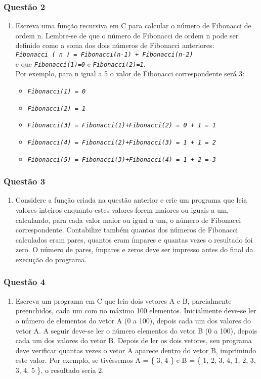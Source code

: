 \documentclass[aspectratio=169]{beamer}
\newcommand\setItemnumber[1]{\setcounter{enumi}{\numexpr#1-1\relax}}
\begin{document}
\begin{frame}\frametitle{Questão 2}
\begin{enumerate}
\setItemnumber{2}
\item Escreva uma função recursiva em C para calcular o número de Fibonacci de ordem n. Lembre-se de que o número de Fibonacci de ordem n pode ser definido como a soma dos dois números de Fibonacci anteriores:\\
\emph{\texttt{Fibonacci ( n )  = Fibonacci(n-1) + Fibonacci(n-2)}}\\
e que \emph{\texttt{Fibonacci(1)=0}} e \emph{\texttt{Fibonacci(2)=1}}.\\
Por exemplo, para n igual a 5 o valor de Fibonacci correspondente será 3:
\begin{itemize}
\item \emph{\texttt{Fibonacci(1) = 0}}
\item \emph{\texttt{Fibonacci(2) = 1}}
\item \emph{\texttt{Fibonacci(3) = Fibonacci(1)+Fibonacci(2) = 0 + 1 = 1}}
\item \emph{\texttt{Fibonacci(4) = Fibonacci(2)+Fibonacci(3) = 1 + 1 = 2}}
\item \emph{\texttt{Fibonacci(5) = Fibonacci(3)+Fibonacci(4) = 1 + 2 = 3}}
\end{itemize}
\end{enumerate}
\end{frame}

\begin{frame}\frametitle{Questão 3}
\begin{enumerate}
\setItemnumber{3}
\item Considere a função criada na questão anterior e crie um programa que leia valores inteiros enquanto estes valores forem maiores ou iguais a um, calculando, para cada valor maior ou igual a um, o número de Fibonacci correspondente. Contabilize também quantos dos números de Fibonacci calculados eram pares, quantos eram ímpares e quantas vezes o resultado foi zero. O número de pares, ímpares e zeros deve ser impresso antes do final da execução do programa.
\end{enumerate}
\end{frame}

\begin{frame}\frametitle{Questão 4}
\begin{enumerate}
\setItemnumber{4}
\item Escreva um programa em C que leia dois vetores A e B, parcialmente preenchidos, cada um com no máximo 100 elementos. Inicialmente deve-se ler o número de elementos do vetor A (0 a 100), depois cada um dos valores do vetor A. A seguir deve-se ler o número elementos do vetor B (0 a 100), depois cada um dos valores do vetor B. Depois de ler os dois vetores, seu programa deve verificar quantas vezes o vetor A aparece dentro do vetor B, imprimindo este valor. Por exemplo, se tivéssemos A = \{ 3, 4 \} e B = \{ 1, 2, 3, 4, 1, 2, 3, 3, 4, 5 \}, o resultado seria 2.
\end{enumerate}
\end{frame}
\end{document}
